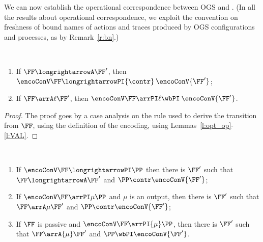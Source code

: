 \fi




\noindent
We can now establish the operational correspondence between OGS and \piI. 
(In all the results about operational correspondence, we exploit the convention on
freshness of bound names of actions and traces produced by OGS configurations and \piI
processes, as by Remark~\ref{r:bn}.)
\begin{lemma}
\label{l:opcorrCON_str}
$ $ \begin{enumerate}

\item If $\FF \longrightarrowA \FF'$, then 
$ \encoConV \FF \longrightarrowPI  {\contr} \: \encoConV {\FF'}$;


\item If $\FF \arrA\ell \FF'$, then
$ \encoConV \FF \arrPI\ell  
 {\wbPI} \:
\encoConV {\FF'}$.
\end{enumerate} 
\end{lemma} 

\begin{proof}
The proof goes by a case analysis on the rule used to derive the transition from 
$\FF $, using the definition of the encoding, using Lemmas~\ref{l:opt_op}-\ref{l:VAL}.
\end{proof} 



\begin{lemma}
\label{l:opcorrCON2}
$ $
\begin{enumerate}
\item If 
$ \encoConV \FF \longrightarrowPI \PP$ then there is $\FF'$ such that 
$\FF \longrightarrowA \FF'$  and  
$\PP   \contr \encoConV {\FF'}$; 

\item If
$ \encoConV \FF \arrPI\mu \PP$
and $\mu$ is an output, 
then there is $\FF'$ such that
$\FF \arrA\mu \FF'$
and $\PP \contr \encoConV {\FF'}$;

\item If  $\FF$ is passive and 
$ \encoConV \FF \arrPI{\mu} \PP$, 
then 
 there is $\FF'$ such that 
$\FF \arrA{\mu} \FF'$
and $\PP  \wbPI \encoConV {\FF'}$.
\end{enumerate} 
\end{lemma} 


